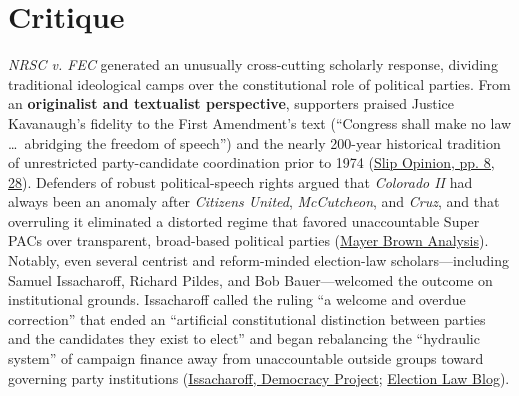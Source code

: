 \documentclass[12pt]{article}
\begin{document}
\section{Critique}
\textit{NRSC v. FEC} generated an unusually cross-cutting scholarly response, dividing traditional ideological camps over the constitutional role of political parties. From an \textbf{originalist and textualist perspective}, supporters praised Justice Kavanaugh's fidelity to the First Amendment's text (``Congress shall make no law \ldots\ abridging the freedom of speech'') and the nearly 200-year historical tradition of unrestricted party-candidate coordination prior to 1974 (\href{https://www.supremecourt.gov/opinions/25pdf/24-621_h315.pdf}{Slip Opinion, pp. 8, 28}). Defenders of robust political-speech rights argued that \textit{Colorado II} had always been an anomaly after \textit{Citizens United}, \textit{McCutcheon}, and \textit{Cruz}, and that overruling it eliminated a distorted regime that favored unaccountable Super PACs over transparent, broad-based political parties (\href{https://www.mayerbrown.com/en/insights/publications/2026/07/supreme-court-strikes-down-limits-on-political-party-coordinated-expenditures}{Mayer Brown Analysis}). Notably, even several centrist and reform-minded election-law scholars---including Samuel Issacharoff, Richard Pildes, and Bob Bauer---welcomed the outcome on institutional grounds. Issacharoff called the ruling ``a welcome and overdue correction'' that ended an ``artificial constitutional distinction between parties and the candidates they exist to elect'' and began rebalancing the ``hydraulic system'' of campaign finance away from unaccountable outside groups toward governing party institutions (\href{https://democracyproject.org/posts/a-welcome-correction-nrsc-v-fec-and-the-need-to-empower-parties}{Issacharoff, Democracy Project}; \href{https://electionlawblog.org/2026/issacharoff-a-welcome-correction-nrsc-v-fec-and-the-need-to-empower-parties/}{Election Law Blog}).
\end{document}
